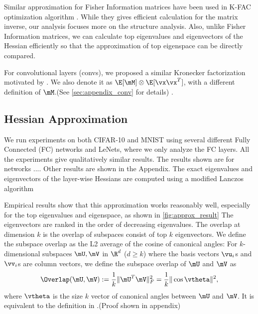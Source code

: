 Similar approximation for Fisher Information matrices have been used in K-FAC optimization algorithm \citep{martens2015optimizing}. While they gives efficient calculation for the matrix inverse, our analysis focuses more on the structure analysis. Also, unlike Fisher Information matrices, we can calculate top eigenvalues and eigenvectors of the Hessian efficiently \citep{yao2019pyhessian} so that the approximation of top eigenspace can be directly compared. 

For convolutional layers (convs), we proposed a similar Kronecker factorization motivated by \citet{grosse2016kronecker}. We also denote it as $\E[\mM]\otimes \E[\vx\vx^T]$, with a different definition of $\mM$.(See \cref{sec:appendix_conv} for details) .
\subsection{Hessian Approximation}
We run experiments on both CIFAR-10 and MNIST  using several different Fully Connected (FC) networks and LeNets, where we only analyze the FC layers. All the experiments give qualitatively similar results. The results shown are for networks .... Other results are shown in the Appendix. The exact eigenvalues and eigenvectors of the layer-wise Hessians are computed using a modified Lanczos algorithm

Empirical results show that this approximation works reasonably well, especially for the top eigenvalues and eigenspace, as shown in \cref{fig:approx_result} The eigenvectors are ranked in the order of decreasing eigenvalues. The overlap at dimension $k$ is the overlap of subspaces consist of top $k$ eigenvectors. We define the subspace overlap as the L2 average of the cosine of canonical angles: For $k$-dimensional subspaces $\mU,\mV$ in $\R^d$ ($d\geq k$) where the basis vectors $\vu_i$s and $\vv_i$s are column vectors, we define the subspace overlap of $\mU$ and $\mV$ as
\begin{equation}
    \Overlap(\mU, \mV) := \frac{1}{k}\|\mU^T\mV\|^2_F =\frac{1}{k}\|\cos\vtheta\|^2,
    \label{eqn:overlap}
\end{equation}
where $\vtheta$ is the size $k$ vector of canonical angles between $\mU$ and $\mV$. It is equivalent to the definition in \citet{gur2018gradient}.(Proof shown in appendix)

